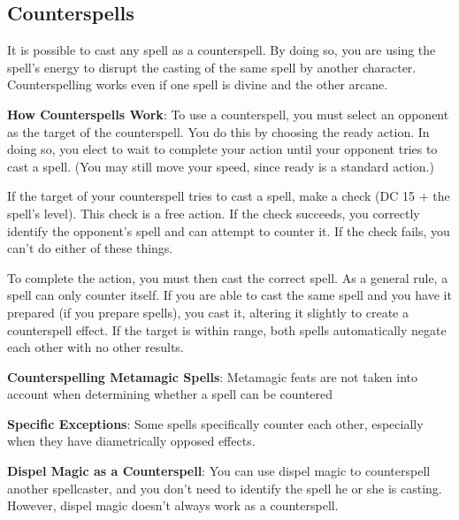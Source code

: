 \subsection{Counterspells}
It is possible to cast any spell as a counterspell. By doing so, you are using the spell's energy to disrupt the casting of the same spell by another character. Counterspelling works even if one spell is divine and the other arcane.

\textbf{How Counterspells Work}: To use a counterspell, you must select an opponent as the target of the counterspell. You do this by choosing the ready action. In doing so, you elect to wait to complete your action until your opponent tries to cast a spell. (You may still move your speed, since ready is a standard action.)

If the target of your counterspell tries to cast a spell, make a  check (DC 15 + the spell's level). This check is a free action. If the check succeeds, you correctly identify the opponent's spell and can attempt to counter it. If the check fails, you can't do either of these things.

To complete the action, you must then cast the correct spell. As a general rule, a spell can only counter itself. If you are able to cast the same spell and you have it prepared (if you prepare spells), you cast it, altering it slightly to create a counterspell effect. If the target is within range, both spells automatically negate each other with no other results.

\textbf{Counterspelling Metamagic Spells}: Metamagic feats are not taken into account when determining whether a spell can be countered

\textbf{Specific Exceptions}: Some spells specifically counter each other, especially when they have diametrically opposed effects.

\textbf{Dispel Magic as a Counterspell}: You can use dispel magic to counterspell another spellcaster, and you don't need to identify the spell he or she is casting. However, dispel magic doesn't always work as a counterspell.